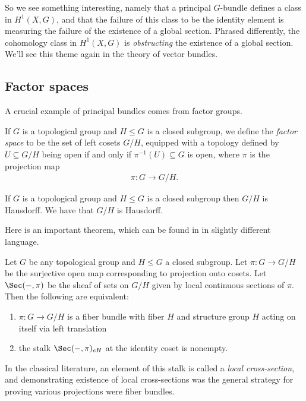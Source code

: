 \documentclass[11pt]{book}
\begin{document}
So we see something interesting, namely that a principal $G$-bundle defines a class in $H^1(X,G)$, and that the failure of this class to be the identity element is measuring the failure of the existence of a global section. Phrased differently, the cohomology class in $H^1(X,G)$ is \emph{obstructing} the existence of a global section. We'll see this theme again in the theory of vector bundles.

\subsection{Factor spaces}

A crucial example of principal bundles comes from factor groups.

\begin{definition} If $G$ is a topological group and $H \le G$ is a closed subgroup, we define the \emph{factor space} to be the set of left cosets $G/H$, equipped with a topology defined by $U \subseteq G/H$ being open if and only if $\pi^{-1}(U) \subseteq G$ is open, where $\pi$ is the projection map
\begin{align*}
    \pi \colon G \to G/H.
\end{align*}
\end{definition}

\begin{exercise}\label{exer:top-grp-mod-subgp-is-Hausdorff} 
If $G$ is a topological group and $H\le G$ is a closed subgroup then $G/H$ is Hausdorff.
We have that $G/H$ is Hausdorff. %
\end{exercise}

Here is an important theorem, which can be found in \cite[p.~30]{Steenrod-fibre-bundles} in slightly different language.

\begin{theorem} Let $G$ be any topological group and $H \le G$ a closed subgroup. Let $\pi \colon G\to G/H$ be the surjective open map corresponding to projection onto cosets. Let $\Sec(-,\pi)$ be the sheaf of sets on $G/H$ given by local continuous sections of $\pi$. Then the following are equivalent:
\begin{enumerate}
    \item $\pi \colon G \to G/H$ is a fiber bundle with fiber $H$ and structure group $H$ acting on itself via left translation
    \item the stalk $\Sec(-,\pi)_{eH}$ at the identity coset is nonempty.
\end{enumerate}
In the classical literature, an element of this stalk is called a \emph{local cross-section}, and demonstrating existence of local cross-sections was the general strategy for proving various projections were fiber bundles.
\end{theorem}
\end{document}
